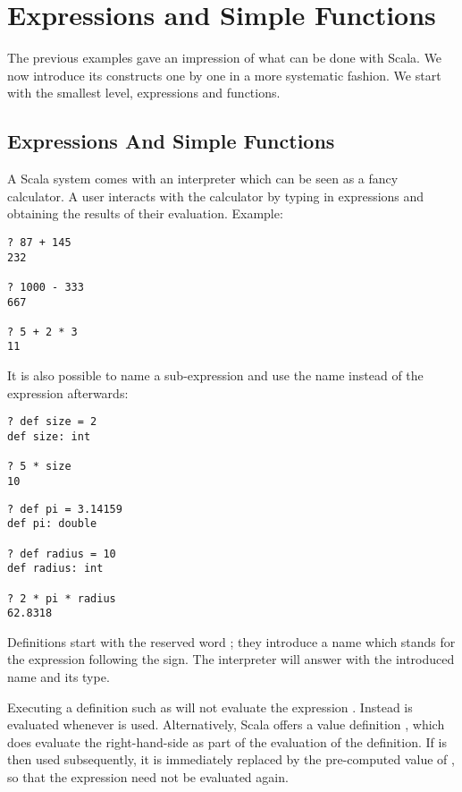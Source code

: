 \documentclass[a4paper,12pt,twoside,titlepage]{book}
\begin{document}
\chapter{\label{chap:simple-funs}Expressions and Simple Functions}

The previous examples gave an impression of what can be done with
Scala.  We now introduce its constructs one by one in a more
systematic fashion. We start with the smallest level, expressions and
functions.

\section{Expressions And Simple Functions}

A Scala system comes with an interpreter which can be seen as a
fancy calculator. A user interacts with the calculator by typing in
expressions and obtaining the results of their evaluation. Example:

\begin{lstlisting}
? 87 + 145
232

? 1000 - 333
667

? 5 + 2 * 3
11
\end{lstlisting}
It is also possible to name a sub-expression and use the name instead
of the expression afterwards:
\begin{lstlisting}
? def size = 2
def size: int

? 5 * size
10
\end{lstlisting}
\begin{lstlisting}
? def pi = 3.14159
def pi: double

? def radius = 10
def radius: int

? 2 * pi * radius
62.8318
\end{lstlisting}
Definitions start with the reserved word ; they introduce a
name which stands for the expression following the \code{=} sign.  The
interpreter will answer with the introduced name and its type.

Executing a definition such as  will not evaluate the
expression .  Instead  is evaluated whenever 
is used. Alternatively, Scala offers a value definition 
, which does evaluate the right-hand-side  as part of the
evaluation of the definition. If  is then used subsequently,
it is immediately replaced by the pre-computed value of
, so that the expression need not be evaluated again.
 
\end{document}
